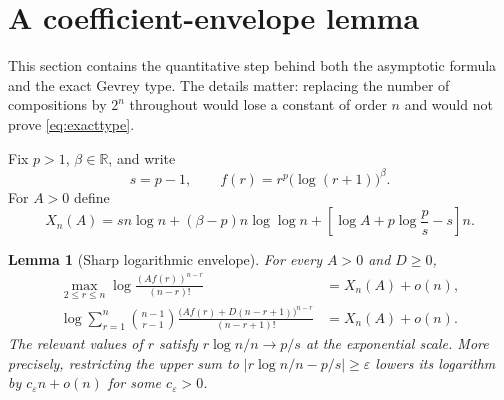 \documentclass[11pt,a4paper]{article}
\numberwithin{equation}{section}
\newtheorem{lemma}[theorem]{Lemma}
\theoremstyle{definition}
\theoremstyle{remark}
\newcommand{\R}{\mathbb R}
\begin{document}
\section{A coefficient-envelope lemma}
\label{sec:envelope}

This section contains the quantitative step behind both the asymptotic
formula and the exact Gevrey type.  The details matter: replacing the number
of compositions by $2^n$ throughout would lose a constant of order $n$ and
would not prove \eqref{eq:exacttype}.

Fix $p>1$, $\beta\in\R$, and write
\[
 s=p-1,\qquad f(r)=r^p\bigl(\log(r+1)\bigr)^\beta.
\]
For $A>0$ define
\begin{equation}
 X_n(A)=s n\log n+(\beta-p)n\log\log n
       +\left[\log A+p\log\frac p s-s\right]n.
 \label{eq:Xn}
\end{equation}

\begin{lemma}[Sharp logarithmic envelope]
\label{lem:envelope}
For every $A>0$ and $D\ge0$,
\begin{align}
 \max_{2\le r\le n}
 \log\frac{(A f(r))^{n-r}}{(n-r)!}
 &=X_n(A)+o(n),
 \label{eq:lowerenvelope}\\
 \log\sum_{r=1}^n
 \binom{n-1}{r-1}
 \frac{\bigl(A f(r)+D(n-r+1)\bigr)^{n-r}}{(n-r+1)!}
 &=X_n(A)+o(n).
 \label{eq:upperenvelope}
\end{align}
The relevant values of $r$ satisfy $r\log n/n\to p/s$ at the
exponential scale.  More precisely, restricting the upper sum to
$|r\log n/n-p/s|\ge\varepsilon$ lowers its logarithm by
$c_\varepsilon n+o(n)$ for some $c_\varepsilon>0$.
\end{lemma}
\end{document}
